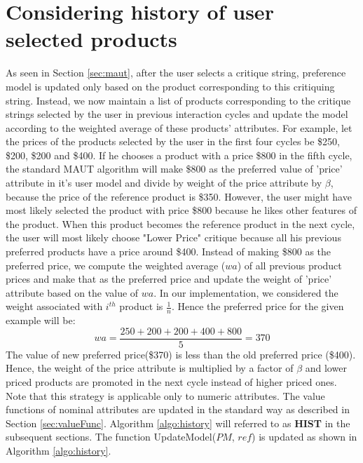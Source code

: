 \section{Considering history of user selected products}
\label{sec:hist}
As seen in Section \ref{sec:maut}, after the user selects a critique string, preference model is updated only based on the product corresponding to this critiquing string.
Instead, we now maintain a list of products corresponding to the critique strings selected by the user in previous interaction cycles and update the model according to the weighted average of these products' attributes.
For example, let the prices of the products selected by the user in the first four cycles be \$250, \$200, \$200 and \$400.
If he chooses a product with a price \$800 in the fifth cycle, the standard MAUT algorithm will make \$800 as the preferred value of 'price' attribute in it's user model and divide by weight of the price attribute by $\beta$, because the price of the reference product is \$350.
However, the user might have most likely selected the product with price \$800 because he likes other features of the product.
When this product becomes the reference product in the next cycle, the user will most likely choose "Lower Price" critique because all his previous preferred products have a price around \$400.
Instead of making \$800 as the preferred price, we compute the weighted average ($wa$) of all previous product prices and make that as the preferred price and update the weight of 'price' attribute based on the value of $wa$.
In our implementation, we considered the weight associated with $i^{th}$ product is $\frac{1}{n}$. 
Hence the preferred price for the given example will be:
\begin{equation}
wa = \frac{250+200+200+400+800} {5} = 370
\end{equation}
The value of new preferred price(\$370) is less than the old preferred price (\$400).
Hence, the weight of the price attribute is multiplied by a factor of $\beta$ and lower priced products are promoted in the next cycle instead of higher priced ones.
Note that this strategy is applicable only to numeric attributes.
The value functions of nominal attributes are updated in the standard way as described in Section \ref{sec:valueFunc}.
Algorithm \ref{algo:history} will referred to as \textbf{HIST} in the subsequent sections.
The function UpdateModel($PM$, $ref$) is updated as shown in Algorithm 
\ref{algo:history}.


